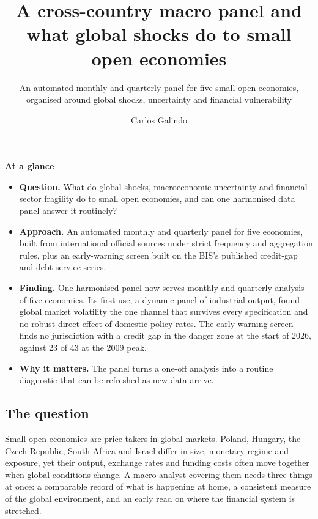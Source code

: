\documentclass[
  british,
  a4paper,
]{article}
\title{A cross-country macro panel and what global shocks do to small
open economies}
\subtitle{An automated monthly and quarterly panel for five small open
economies, organised around global shocks, uncertainty and financial
vulnerability}
\author{Carlos Galindo}
\date{}
\providecommand{\tightlist}{%
  \setlength{\itemsep}{0pt}\setlength{\parskip}{0pt}}
\begin{document}
\maketitle


\begin{tcolorbox}[enhanced jigsaw, arc=.35mm, bottomrule=.15mm, breakable, colback=white, colframe=quarto-callout-note-color-frame, left=2mm, leftrule=.75mm, opacityback=0, rightrule=.15mm, toprule=.15mm]

\vspace{-3mm}\textbf{At a glance}\vspace{3mm}

\begin{itemize}
\tightlist
\item
  \textbf{Question.} What do global shocks, macroeconomic uncertainty
  and financial-sector fragility do to small open economies, and can one
  harmonised data panel answer it routinely?
\item
  \textbf{Approach.} An automated monthly and quarterly panel for five
  economies, built from international official sources under strict
  frequency and aggregation rules, plus an early-warning screen built on
  the BIS's published credit-gap and debt-service series.
\item
  \textbf{Finding.} One harmonised panel now serves monthly and
  quarterly analysis of five economies. Its first use, a dynamic panel
  of industrial output, found global market volatility the one channel
  that survives every specification and no robust direct effect of
  domestic policy rates. The early-warning screen finds no jurisdiction
  with a credit gap in the danger zone at the start of 2026, against 23
  of 43 at the 2009 peak.
\item
  \textbf{Why it matters.} The panel turns a one-off analysis into a
  routine diagnostic that can be refreshed as new data arrive.
\end{itemize}

\end{tcolorbox}

\subsection{The question}\label{the-question}

Small open economies are price-takers in global markets. Poland,
Hungary, the Czech Republic, South Africa and Israel differ in size,
monetary regime and exposure, yet their output, exchange rates and
funding costs often move together when global conditions change. A macro
analyst covering them needs three things at once: a comparable record of
what is happening at home, a consistent measure of the global
environment, and an early read on where the financial system is
stretched.
\end{document}
